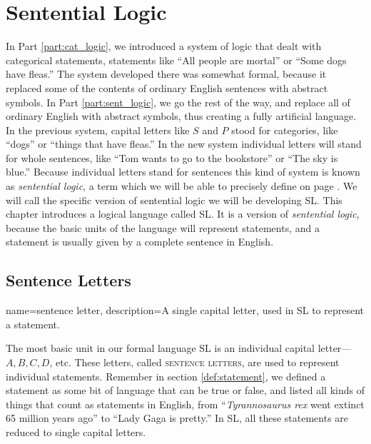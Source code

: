 \chapter{Sentential Logic}
\label{chap:SL}


{In Part \ref{part:cat_logic}, we introduced a system of logic that dealt with categorical statements, statements like ``All people are mortal'' or ``Some dogs have  fleas.'' The system developed there was somewhat formal, because it replaced some of the contents of ordinary English sentences with abstract symbols. In Part \ref{part:sent_logic}, we go the rest of the way, and replace all of ordinary English with abstract symbols, thus creating a fully artificial language. In the previous system, capital letters like $S$ and $P$ stood for categories, like ``dogs'' or ``things that have fleas.'' In the new system individual letters will stand for whole sentences, like ``Tom wants to go to the bookstore'' or ``The sky is blue.'' Because individual letters stand for sentences this kind of system is known as \textit{sentential logic}, a term which we will be able to precisely define on page \pageref{def:sentential_logic}. We will call the specific version of sentential logic we will be developing SL.}%
{This chapter introduces a logical language called SL. It is a version of \emph{sentential logic}, because the basic units of the language will represent statements, and a statement is usually given by a complete sentence in English.} %








\section{Sentence Letters}


{
name=sentence letter,
description={A single capital letter, used in SL to represent a statement.}
}

The most basic unit in our formal language SL is an individual capital letter---$A, B, C, D$, etc. These letters, called \textsc{\glspl{sentence letter}}, \label{def:sentence_letter} are used to represent individual statements. Remember in section \ref{def:statement}, we defined a statement as some bit of language that can be true or false, and listed all kinds of things that count as statements in English, from ``\emph{Tyrannosaurus rex} went extinct 65 million years ago'' to ``Lady Gaga is pretty.'' In SL, all these statements are reduced to single capital letters.

